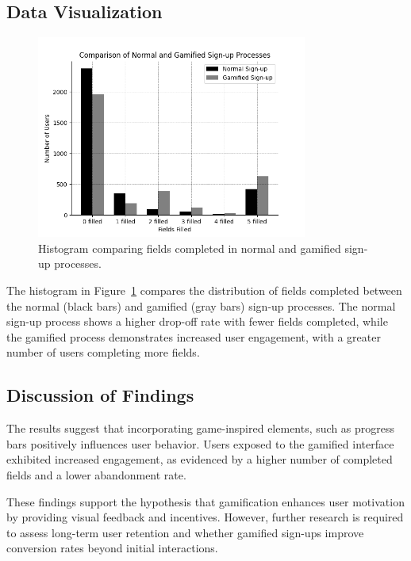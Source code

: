 \documentclass[conference]{IEEEtran}
\begin{document}
\subsection{Data Visualization}
\begin{figure}[!ht]
\centering
\includegraphics[width=3.5in]{media/sign_up_comparison.png}
\caption{Histogram comparing fields completed in normal and gamified sign-up processes.}
\label{fig:sign_up_comparison}
\end{figure}
The histogram in Figure~\ref{fig:sign_up_comparison} compares the distribution of fields completed between the normal (black bars) and gamified (gray bars) sign-up processes. The normal sign-up process shows a higher drop-off rate with fewer fields completed, while the gamified process demonstrates increased user engagement, with a greater number of users completing more fields.

\subsection{Discussion of Findings}
The results suggest that incorporating game-inspired elements, such as progress bars positively influences user behavior. Users exposed to the gamified interface exhibited increased engagement, as evidenced by a higher number of completed fields and a lower abandonment rate.

These findings support the hypothesis that gamification enhances user motivation by providing visual feedback and incentives. However, further research is required to assess long-term user retention and whether gamified sign-ups improve conversion rates beyond initial interactions.
\end{document}

